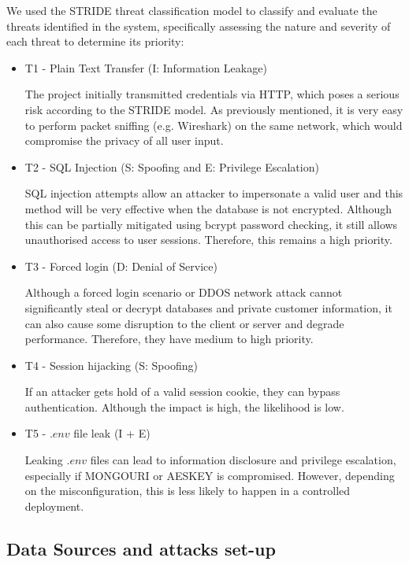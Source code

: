 \documentclass{article}
\begin{document}
We used the STRIDE\cite{microsoft_stride} threat classification model to classify and evaluate the threats identified in the system, specifically assessing the nature and severity of each threat to determine its priority:

\begin{itemize}
    \item T1 - Plain Text Transfer (I: Information Leakage)
    
    The project initially transmitted credentials via HTTP, which poses a serious risk according to the STRIDE model. As previously mentioned, it is very easy to perform packet sniffing (e.g. Wireshark) on the same network, which would compromise the privacy of all user input.
    
    \item T2 - SQL Injection (S: Spoofing and E: Privilege Escalation)
    
    SQL injection attempts allow an attacker to impersonate a valid user and this method will be very effective when the database is not encrypted. Although this can be partially mitigated using bcrypt password checking, it still allows unauthorised access to user sessions. Therefore, this remains a high priority.
    
    \item T3 - Forced login (D: Denial of Service)
    
    Although a forced login scenario or DDOS network attack cannot significantly steal or decrypt databases and private customer information, it can also cause some disruption to the client or server and degrade performance. Therefore, they have medium to high priority.
    
    \item T4 - Session hijacking (S: Spoofing)
    
    If an attacker gets hold of a valid session cookie, they can bypass authentication. Although the impact is high, the likelihood is low.
    
    \item T5 - $.env$ file leak (I + E)
    
    Leaking $.env$ files can lead to information disclosure and privilege escalation, especially if MONGOURI or AESKEY is compromised. However, depending on the misconfiguration, this is less likely to happen in a controlled deployment.
    
\end{itemize}


\subsection{Data Sources and attacks set-up}
\end{document}
